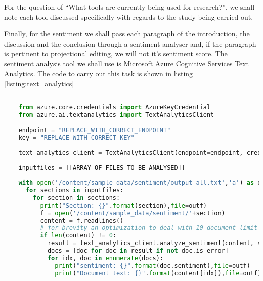 For the question of ``What tools are currently being used for research?'', we shall note each tool discussed specifically with regards to the study being carried out.

Finally, for the sentiment we shall pass each paragraph of the introduction, the discussion and the conclusion through a sentiment analyser and, if the paragraph is pertinent to projectional editing, we will not it's sentiment score.
The sentiment analysis tool we shall use is Microsoft Azure Cognitive Services Text Analytics.
The code to carry out this task is shown in listing \ref{listing:text_analytics}

\begin{lstlisting}[language=Python, caption=Text Analytics code., captionpos=b, label=listing:text_analytics, breaklines=true]

    from azure.core.credentials import AzureKeyCredential
    from azure.ai.textanalytics import TextAnalyticsClient
    
    endpoint = "REPLACE_WITH_CORRECT_ENDPOINT"
    key = "REPLACE_WITH_CORRECT_KEY"
    
    text_analytics_client = TextAnalyticsClient(endpoint=endpoint, credential=AzureKeyCredential(key))
    
    inputfiles = [[ARRAY_OF_FILES_TO_BE_ANALYSED]]
    
    with open('/content/sample_data/sentiment/output_all.txt','a') as outf:
      for sections in inputfiles:
        for section in sections:
          print("Section: {}".format(section),file=outf)
          f = open('/content/sample_data/sentiment/'+section)
          content = f.readlines()
          # for brevity an optimization to deal with 10 document limit is removed
          if len(content) != 0:
            result = text_analytics_client.analyze_sentiment(content, show_opinion_mining=True)
            docs = [doc for doc in result if not doc.is_error]
            for idx, doc in enumerate(docs):
              print("sentiment: {}".format(doc.sentiment),file=outf)
              print("Document text: {}".format(content[idx]),file=outf)
\end{lstlisting}


